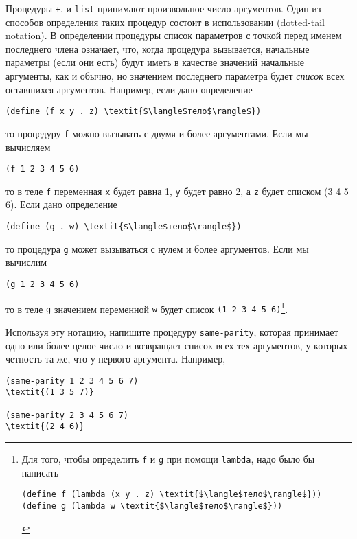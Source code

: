 \begin{exercise}{2.20}\label{EX2.20}%
Процедуры {\tt +}, {\tt *} и
{\tt list} принимают    произвольное число
аргументов.  Один из  способов определения таких процедур состоит в
использовании   (dotted-tail notation). 
В определении процедуры список параметров с точкой перед 
именем последнего члена означает, что, когда процедура вызывается,
начальные параметры (если они есть) будут иметь в качестве значений
начальные аргументы, как и обычно, но значением последнего параметра
будет {\em список} всех оставшихся аргументов.  Например, если
дано определение
\begin{Verbatim}[fontsize=\small]
(define (f x y . z) \textit{$\langle$тело$\rangle$})
\end{Verbatim}
то процедуру {\tt f} можно вызывать с двумя и более
аргументами.  Если мы вычисляем

\begin{Verbatim}[fontsize=\small]
(f 1 2 3 4 5 6)
\end{Verbatim}
то в теле {\tt f} переменная {\tt x} будет равна 1,
{\tt y} будет равно 2, а {\tt z} будет списком (3 4 5
6).  Если дано определение

\begin{Verbatim}[fontsize=\small]
(define (g . w) \textit{$\langle$тело$\rangle$})
\end{Verbatim}
то процедура {\tt g} может вызываться с нулем и более
аргументов.  Если мы вычислим

\begin{Verbatim}[fontsize=\small]
(g 1 2 3 4 5 6)
\end{Verbatim}
то в теле {\tt g} значением переменной {\tt w} будет
список {\tt (1 2 3 4 5 6)}\footnote{Для того, чтобы определить {\tt f} и
{\tt g} при помощи {\tt lambda}, надо было бы написать


\begin{Verbatim}[fontsize=\footnotesize]
(define f (lambda (x y . z) \textit{$\langle$тело$\rangle$}))
(define g (lambda w \textit{$\langle$тело$\rangle$}))
\end{Verbatim}
}.

Используя эту нотацию, напишите процедуру
{\tt same-parity}, которая принимает одно или более целое число 
и возвращает список всех тех аргументов, у которых четность та же, что 
у первого аргумента. Например,

\begin{Verbatim}[fontsize=\small]
(same-parity 1 2 3 4 5 6 7)
\textit{(1 3 5 7)}

(same-parity 2 3 4 5 6 7)
\textit{(2 4 6)}
\end{Verbatim}
\end{exercise}

